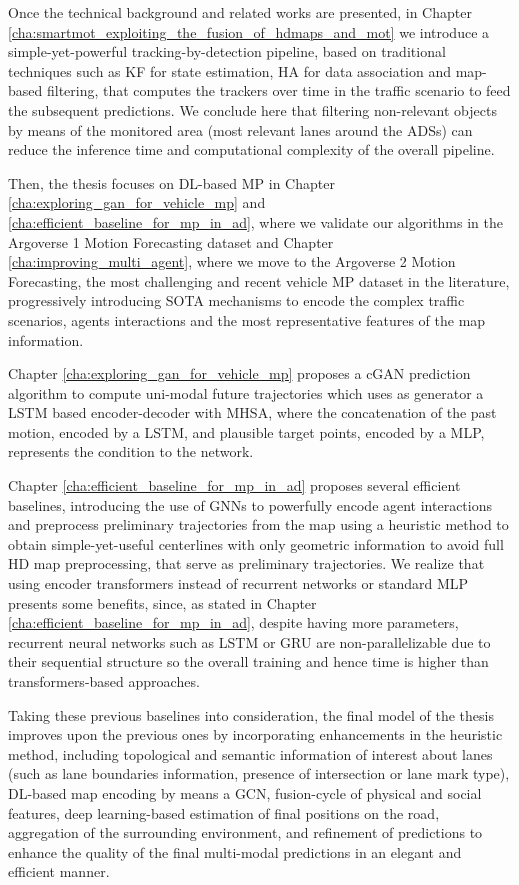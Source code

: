Once the technical background and related works are presented, in Chapter \ref{cha:smartmot_exploiting_the_fusion_of_hdmaps_and_mot} we introduce a simple-yet-powerful tracking-by-detection pipeline, based on traditional techniques such as \acf{KF} for state estimation, \acf{HA} for data association and map-based filtering, that computes the trackers over time in the traffic scenario to feed the subsequent predictions. We conclude here that filtering non-relevant objects by means of the monitored area (most relevant lanes around the \acfp{ADS}) can reduce the inference time and computational complexity of the overall pipeline.

Then, the thesis focuses on \acf{DL}-based \ac{MP} in Chapter \ref{cha:exploring_gan_for_vehicle_mp} and \ref{cha:efficient_baseline_for_mp_in_ad}, where we validate our algorithms in the Argoverse 1 Motion Forecasting dataset and Chapter \ref{cha:improving_multi_agent}, where we move to the Argoverse 2 Motion Forecasting, the most challenging and recent vehicle \ac{MP} dataset in the literature, progressively introducing \acf{SOTA} mechanisms to encode the complex traffic scenarios, agents interactions and the most representative features of the map information. 

Chapter \ref{cha:exploring_gan_for_vehicle_mp} proposes a \acf{cGAN} prediction algorithm to compute uni-modal future trajectories which uses as generator a \acf{LSTM} based encoder-decoder with \acf{MHSA}, where the concatenation of the past motion, encoded by a \ac{LSTM}, and plausible target points, encoded by a \acf{MLP}, represents the condition to the network. 

Chapter \ref{cha:efficient_baseline_for_mp_in_ad} proposes several efficient baselines, introducing the use of \acfp{GNN} to powerfully encode agent interactions and preprocess preliminary trajectories from the map using a heuristic method to obtain simple-yet-useful centerlines with only geometric information to avoid full HD map preprocessing, that serve as preliminary trajectories. We realize that using encoder transformers instead of recurrent networks or standard \ac{MLP} presents some benefits, since, as stated in Chapter \ref{cha:efficient_baseline_for_mp_in_ad}, despite having more parameters, recurrent neural networks such as \acf{LSTM} or \acf{GRU} are non-parallelizable due to their sequential structure so the overall training and hence time is higher than transformers-based approaches.

Taking these previous baselines into consideration, the final model of the thesis improves upon the previous ones by incorporating enhancements in the heuristic method, including topological and semantic information of interest about lanes (such as lane boundaries information, presence of intersection or lane mark type), \acf{DL}-based map encoding by means a \acf{GCN}, fusion-cycle of physical and social features, deep learning-based estimation of final positions on the road, aggregation of the surrounding environment, and refinement of predictions to enhance the quality of the final multi-modal predictions in an elegant and efficient manner.

